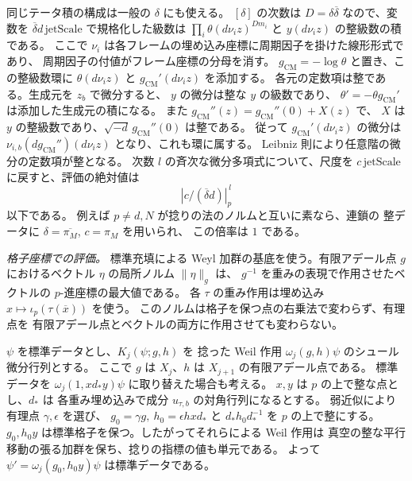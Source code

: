 同じテータ積の構成は一般の \(\delta\) にも使える。
\([\delta]\) の次数は \(D=\delta\overline\delta\) なので、変数を
\(\overline\delta d\,\mathrm{jetScale}\) で規格化した級数は
\(\prod_i\theta(d\nu_i z)^{D m_i}\) と
\(y(d\nu_i z)\) の整級数の積である。
ここで \(\nu_i\) は各フレームの埋め込み座標に周期因子を掛けた線形形式であり、
周期因子の付値がフレーム座標の分母を消す。
\(g_\mathrm{CM}=-\log\theta\) と置き、この整級数環に
\(\theta(d\nu_i z)\) と \(g_\mathrm{CM}'(d\nu_i z)\) を添加する。
各元の定数項は整である。生成元を \(z_b\) で微分すると、
\(y\) の微分は整な \(y\) の級数であり、
\(\theta'=-\theta g_\mathrm{CM}'\) は添加した生成元の積になる。
また \(g_\mathrm{CM}''(z)=g_\mathrm{CM}''(0)+X(z)\) で、
\(X\) は \(y\) の整級数であり、\(\sqrt{-d}\,g_\mathrm{CM}''(0)\) は整である。
従って \(g_\mathrm{CM}'(d\nu_i z)\) の微分は
\(\nu_{i,b}(d g_\mathrm{CM}'')(d\nu_i z)\) となり、これも環に属する。
Leibniz 則により任意階の微分の定数項が整となる。
次数 \(l\) の斉次な微分多項式について、尺度を
\(c\,\mathrm{jetScale}\) に戻すと、評価の絶対値は
\begin{equation}\label{eq:upper-all-prime-jets}
 \left|c/(\overline\delta d)\right|_p^{\,l}
\end{equation}
以下である。
例えば \(p\ne d,N\) が捻りの法のノルムと互いに素なら、連鎖の
整データに \(\delta=\overline{\pi_M}\), \(c=\pi_M\) を用いられ、
この倍率は \(1\) である。

\emph{格子座標での評価。}
標準充填による Weyl 加群の基底を使う。有限アデール点 \(g\) におけるベクトル
\(\eta\) の局所ノルム \(\|\eta\|_g\) は、
\(g^{-1}\) を重みの表現で作用させたベクトルの \(p\)-進座標の最大値である。
各 \(\tau\) の重み作用は埋め込み \(x\mapsto\iota_p(\tau(\overline x))\) を使う。
このノルムは格子を保つ点の右乗法で変わらず、有理点を
有限アデール点とベクトルの両方に作用させても変わらない。

\(\psi\) を標準データとし、\(K_j(\psi;g,h)\) を
捻った Weil 作用 \(\omega_j(g,h)\psi\) のシュール微分行列とする。
ここで \(g\) は \(X_j\)、\(h\) は \(X_{j+1}\) の有限アデール点である。
標準データを \(\omega_j(1,x d_\ast y)\psi\) に取り替えた場合も考える。
\(x,y\) は \(p\) の上で整な点とし、\(d_\ast\) は
各重み埋め込みで成分 \(u_{\tau,b}\) の対角行列になるとする。
弱近似により有理点 \(\gamma,\epsilon\) を選び、
\(g_0=\gamma g,\ h_0=\epsilon h x d_\ast\) と
\(d_\ast h_0 d_\ast^{-1}\) を \(p\) の上で整にする。
\(g_0,h_0 y\) は標準格子を保つ。したがってそれらによる Weil 作用は
真空の整な平行移動の張る加群を保ち、捻りの指標の値も単元である。
よって \(\psi'=\omega_j(g_0,h_0 y)\psi\) は標準データである。

